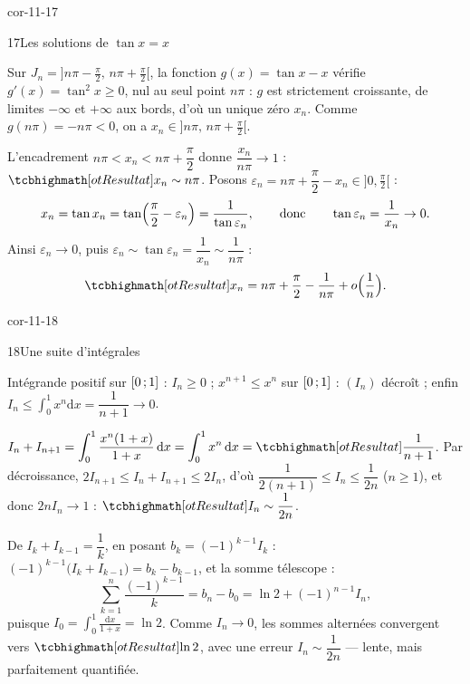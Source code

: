 \begin{blocLivre}{cor-11-17}
\begin{corrige}{17}{Les solutions de $\tan x=x$}
\begin{questions}
  \item Sur $J_n=\bigl]n\pi-\frac{\pi}{2},\,n\pi+\frac{\pi}{2}\bigr[$, la
    fonction $g(x)=\tan x-x$ vérifie $g'(x)=\tan^{2}x\geqslant0$, nul au
    seul point $n\pi$ : $g$ est strictement croissante, de limites
    $-\infty$ et $+\infty$ aux bords, d'où un unique zéro $x_n$. Comme
    $g(n\pi)=-n\pi<0$, on a $x_n\in\bigl]n\pi,\,n\pi+\frac{\pi}{2}\bigr[$.
  \item L'encadrement $n\pi<x_n<n\pi+\dfrac{\pi}{2}$ donne
    $\dfrac{x_n}{n\pi}\to1$ : $\res{x_n\sim n\pi}$. Posons
    $\varepsilon_n=n\pi+\dfrac{\pi}{2}-x_n\in\bigl]0,\frac{\pi}{2}\bigr[$ :
    \[
    x_n=\tan x_n=\tan\Bigl(\frac{\pi}{2}-\varepsilon_n\Bigr)
    =\frac{1}{\tan\varepsilon_n},
    \qquad\text{donc}\qquad
    \tan\varepsilon_n=\frac{1}{x_n}\to0 .
    \]
    Ainsi $\varepsilon_n\to0$, puis
    $\varepsilon_n\sim\tan\varepsilon_n=\dfrac{1}{x_n}\sim\dfrac{1}{n\pi}$ :
    \[
    \res{x_n=n\pi+\frac{\pi}{2}-\frac{1}{n\pi}+o\Bigl(\frac1n\Bigr)}.
    \]
\end{questions}
\end{corrige}
\end{blocLivre}

\begin{blocLivre}{cor-11-18}
\begin{corrige}{18}{Une suite d'intégrales}
\begin{questions}
  \item Intégrande positif sur $\mathopen{[}0\,{;}\,1\mathclose{]}$ : $I_n\geqslant0$ ;
    $x^{n+1}\leqslant x^{n}$ sur $\mathopen{[}0\,{;}\,1\mathclose{]}$ : $(I_n)$ décroît ; enfin
    $I_n\leqslant\displaystyle\int_{0}^{1}x^{n}\mathrm{d}x=\dfrac{1}{n+1}\to0$.
  \item $I_n+I_{n+1}=\displaystyle\int_{0}^{1}\frac{x^{n}(1+x)}{1+x}\,\mathrm{d}x
    =\int_{0}^{1}x^{n}\,\mathrm{d}x=\res{\dfrac{1}{n+1}}$. Par décroissance,
    $2I_{n+1}\leqslant I_n+I_{n+1}\leqslant2I_n$, d'où
    $\dfrac{1}{2(n+1)}\leqslant I_n\leqslant\dfrac{1}{2n}$ ($n\geqslant1$),
    et donc $2nI_n\to1$ : $\res{I_n\sim\dfrac{1}{2n}}$.
  \item De $I_k+I_{k-1}=\dfrac1k$, en posant $b_k=(-1)^{k-1}I_k$ :
    $(-1)^{k-1}\bigl(I_k+I_{k-1}\bigr)=b_k-b_{k-1}$, et la somme télescope :
    \[
    \sum_{k=1}^{n}\frac{(-1)^{k-1}}{k}=b_n-b_0=\ln2+(-1)^{n-1}I_n ,
    \]
    puisque $I_0=\displaystyle\int_{0}^{1}\frac{\mathrm{d}x}{1+x}=\ln2$. Comme
    $I_n\to0$, les sommes alternées convergent vers $\res{\ln2}$, avec une
    erreur $I_n\sim\dfrac{1}{2n}$ — lente, mais parfaitement quantifiée.
\end{questions}
\end{corrige}
\end{blocLivre}

